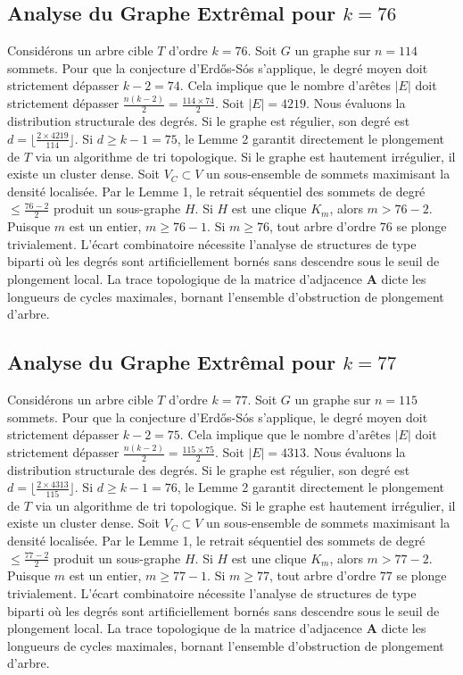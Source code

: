 \documentclass[11pt,a4paper]{article}
\begin{document}
\subsection{Analyse du Graphe Extr\^emal pour $k=76$}
Consid\'erons un arbre cible $T$ d'ordre $k=76$.
Soit $G$ un graphe sur $n=114$ sommets.
Pour que la conjecture d'Erd\H{o}s-S\'os s'applique, le degr\'e moyen doit strictement d\'epasser $k-2 = 74$.
Cela implique que le nombre d'ar\^etes $|E|$ doit strictement d\'epasser $\frac{n(k-2)}{2} = \frac{114 \times 74}{2}$.
Soit $|E| = 4219$.
Nous \'evaluons la distribution structurale des degr\'es. Si le graphe est r\'egulier, son degr\'e est $d = \lfloor \frac{2 \times 4219}{114} \rfloor$.
Si $d \geq k-1 = 75$, le Lemme 2 garantit directement le plongement de $T$ via un algorithme de tri topologique.
Si le graphe est hautement irr\'egulier, il existe un cluster dense. Soit $V_C \subset V$ un sous-ensemble de sommets maximisant la densit\'e localis\'ee.
Par le Lemme 1, le retrait s\'equentiel des sommets de degr\'e $\leq \frac{76-2}{2}$ produit un sous-graphe $H$.
Si $H$ est une clique $K_{m}$, alors $m > 76-2$. Puisque $m$ est un entier, $m \geq 76-1$. Si $m \geq 76$, tout arbre d'ordre $76$ se plonge trivialement.
L'\'ecart combinatoire n\'ecessite l'analyse de structures de type biparti o\`u les degr\'es sont artificiellement born\'es sans descendre sous le seuil de plongement local. La trace topologique de la matrice d'adjacence $\mathbf{A}$ dicte les longueurs de cycles maximales, bornant l'ensemble d'obstruction de plongement d'arbre.


\subsection{Analyse du Graphe Extr\^emal pour $k=77$}
Consid\'erons un arbre cible $T$ d'ordre $k=77$.
Soit $G$ un graphe sur $n=115$ sommets.
Pour que la conjecture d'Erd\H{o}s-S\'os s'applique, le degr\'e moyen doit strictement d\'epasser $k-2 = 75$.
Cela implique que le nombre d'ar\^etes $|E|$ doit strictement d\'epasser $\frac{n(k-2)}{2} = \frac{115 \times 75}{2}$.
Soit $|E| = 4313$.
Nous \'evaluons la distribution structurale des degr\'es. Si le graphe est r\'egulier, son degr\'e est $d = \lfloor \frac{2 \times 4313}{115} \rfloor$.
Si $d \geq k-1 = 76$, le Lemme 2 garantit directement le plongement de $T$ via un algorithme de tri topologique.
Si le graphe est hautement irr\'egulier, il existe un cluster dense. Soit $V_C \subset V$ un sous-ensemble de sommets maximisant la densit\'e localis\'ee.
Par le Lemme 1, le retrait s\'equentiel des sommets de degr\'e $\leq \frac{77-2}{2}$ produit un sous-graphe $H$.
Si $H$ est une clique $K_{m}$, alors $m > 77-2$. Puisque $m$ est un entier, $m \geq 77-1$. Si $m \geq 77$, tout arbre d'ordre $77$ se plonge trivialement.
L'\'ecart combinatoire n\'ecessite l'analyse de structures de type biparti o\`u les degr\'es sont artificiellement born\'es sans descendre sous le seuil de plongement local. La trace topologique de la matrice d'adjacence $\mathbf{A}$ dicte les longueurs de cycles maximales, bornant l'ensemble d'obstruction de plongement d'arbre.
\end{document}
